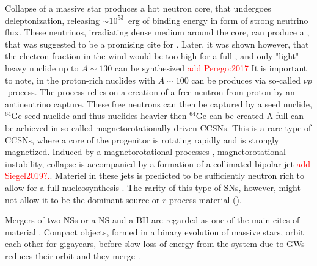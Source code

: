 Collapse of a massive star produces a hot neutron core, that undergoes deleptonization, releasing 
$\sim10^{53}$~erg of binding energy in form of strong neutrino flux. These neutrinos, irradiating 
dense medium around the core, can produce a \nwind{} \citep{Qian:1996xt}, that was suggested to be 
a promising cite for \rproc{} \citep{Woosley:2002,Wanajo:2006mq}. Later, it was shown however, that 
the electron fraction in the wind would be too high for a full \rproc{}, and only "light" heavy 
nuclide up to $A\sim130$ can be synthesized 
\citep{Qian:1996xt,Thompson:2001ys,Fischer:2010,Roberts:2010,MartinezPinedo:2012rb,Wanajo:2013} 
\textcolor{red}{add Perego:2017} 
%
It is important to note, in the proton-rich \nwind{} nuclides with $A\sim 100$ can be produces 
via so-called $\nu p$-process. The process relies on a creation of a free neutron from proton by 
an antineutrino capture. These free neutrons can then be captured by a seed nuclide, $^{64}$Ge seed 
nuclide and thus nuclides heavier then $^{64}$Ge can be created
\citep{Frohlich:2006,Pruet:2005qd,Wanajo:2010mc,Arcones:2012}
%
A full \rproc{} can be achieved in so-called magnetorotationally driven \acp{CCSN}. This is a rare 
type of \acp{CCSN}, where a core of the progenitor is rotating rapidly and is strongly magnetized. 
Induced by a magnetorotational processes \eg, magnetorotational instability, collapse is accompanied by a
formation of a collimated bipolar jet 
\citep{Wheeler:2000,Akiyama:2003,Burrows:2007yx,Mosta:2014jaa,Mosta:2015} \textcolor{red}{add Siegel2019?.}.
Materiel in these jets is predicted to be sufficiently neutron rich to allow for a full \rproc{} 
nucleosynthesis \citep{Winteler:2012,Nishimura:2015nca}. The rarity of this type of \acp{SN}, 
however, might not allow it to be the dominant source or $r$-process material \citep{Nishimura:2015nca} 
(). 



Mergers of two \acp{NS} or a \ac{NS} and a \ac{BH} are regarded as one of the main cites 
of \rproc{} material . Compact objects, formed in a binary evolution of massive stars, 
orbit each other for gigayears, before slow loss of energy from the system due to \acp{GW} 
reduces their orbit and they merge \citep[\eg][]{Hulse:1975,Lattimer:2004sa,Price:2006fi}. 
%

